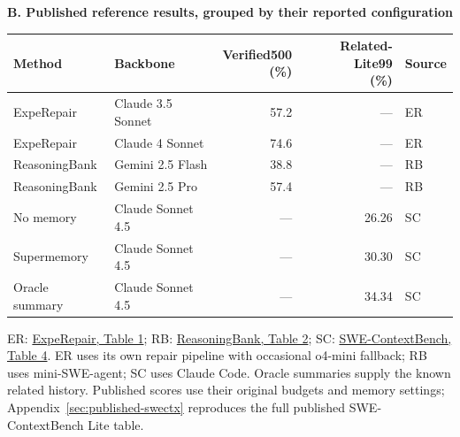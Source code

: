 \begin{table}[!htbp]
\medskip
\textbf{B. Published reference results, grouped by their reported configuration}\\[3pt]
\begin{tabular}{llrrl}
\toprule
Method & Backbone & \shortstack{Verified500\\(\%)} & \shortstack{Related-Lite99\\(\%)} & Source \\
\midrule
ExpeRepair & Claude 3.5 Sonnet & 57.2 & --- & ER \\
ExpeRepair & Claude 4 Sonnet & 74.6 & --- & ER \\
ReasoningBank & Gemini 2.5 Flash & 38.8 & --- & RB \\
ReasoningBank & Gemini 2.5 Pro & 57.4 & --- & RB \\
No memory & Claude Sonnet 4.5 & --- & 26.26 & SC \\
Supermemory & Claude Sonnet 4.5 & --- & 30.30 & SC \\
Oracle summary & Claude Sonnet 4.5 & --- & 34.34 & SC \\
\bottomrule
\end{tabular}

\smallskip
\begin{minipage}{\linewidth}\footnotesize
ER: \href{https://arxiv.org/html/2506.10484v2}{ExpeRepair, Table 1};
RB: \href{https://arxiv.org/html/2509.25140}{ReasoningBank, Table 2};
SC: \href{https://arxiv.org/html/2602.08316v3\#S3.T4}{SWE-ContextBench, Table 4}.
ER uses its own repair pipeline with occasional o4-mini fallback;
RB uses mini-SWE-agent; SC uses Claude Code.
Oracle summaries supply the known related history. Published scores use
their original budgets and memory settings;
Appendix~\ref{sec:published-swectx} reproduces the full published
SWE-ContextBench Lite table.
\end{minipage}
\end{table}
